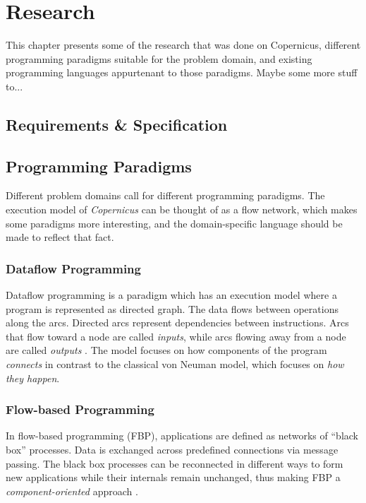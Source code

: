 \chapter{Research}\label{chap:research}
This chapter presents some of the research that was done on
Copernicus, different programming paradigms suitable for the problem
domain, and existing programming languages appurtenant to those
paradigms. Maybe some more stuff to...



\section{Requirements \& Specification}


\section{Programming Paradigms}
Different problem domains call for different programming
paradigms. The execution model of \emph{Copernicus} can be thought of
as a flow network, which makes some paradigms more interesting, and
the domain-specific language should be made to reflect that fact.


\subsection{Dataflow Programming}
Dataflow programming is a paradigm which has an execution model where
a program is represented as directed graph. The data flows between
operations along the arcs. Directed arcs represent dependencies
between instructions. Arcs that flow toward a node are called
\emph{inputs}, while arcs flowing away from a node are called
\emph{outputs} \citep{johnston:2004}. The model focuses on how
components of the program \emph{connects} in contrast to the classical
von Neuman model, which focuses on \emph{how they happen}.


\subsection{Flow-based Programming}
In flow-based programming (FBP), applications are defined as networks
of ``black box'' processes. Data is exchanged across predefined
connections via message passing. The black box processes can be
reconnected in different ways to form new applications while their
internals remain unchanged, thus making FBP a
\emph{component-oriented} approach
\citep{morrison:2010,morrison:online}.


